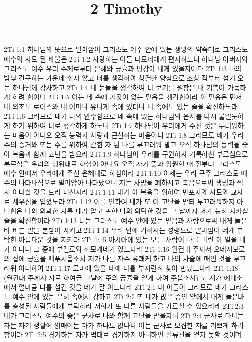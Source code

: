 

\title{2 Timothy}

2Ti 1:1  하나님의 뜻으로 말미암아 그리스도 예수 안에 있는 생명의 약속대로 그리스도 예수의 사도 된 바울은
2Ti 1:2  사랑하는 아들 디모데에게 편지하노니 하나님 아버지와 그리스도 예수 우리 주께로부터 은혜와 긍휼과 평강이 네게 있을지어다
2Ti 1:3  나의 밤낮 간구하는 가운데 쉬지 않고 너를 생각하여 청결한 양심으로 조상 적부터 섬겨 오는 하나님께 감사하고
2Ti 1:4  네 눈물을 생각하여 너 보기를 원함은 내 기쁨이 가득하게 하려 함이니
2Ti 1:5  이는 네 속에 거짓이 없는 믿음을 생각함이라 이 믿음은 먼저 네 외조모 로이스와 네 어머니 유니게 속에 있더니 네 속에도 있는 줄을 확신하노라
2Ti 1:6  그러므로 내가 나의 안수함으로 네 속에 있는 하나님의 은사를 다시 붙일듯하게 하기 위하여 너로 생각하게 하노니
2Ti 1:7  하나님이 우리에게 주신 것은 두려워하는 마음이 아니요 오직 능력과 사랑과 근신하는 마음이니
2Ti 1:8  그러므로 네가 우리 주의 증거와 또는 주를 위하여 갇힌 자 된 나를 부끄러워 말고 오직 하나님의 능력을 좇아 복음과 함께 고난을 받으라
2Ti 1:9  하나님이 우리를 구원하사 거룩하신 부르심으로 부르심은 우리의 행위대로 하심이 아니요 오직 자기 뜻과 영원한 때 전부터 그리스도 예수 안에서 우리에게 주신 은혜대로 하심이라
2Ti 1:10  이제는 우리 구주 그리스도 예수의 나타나심으로 말미암아 나타났으니 저는 사망을 폐하시고 복음으로써 생명과 썩지 아니할 것을 드러 내신지라
2Ti 1:11  내가 이 복음을 위하여 반포자와 사도와 교사로 세우심을 입었노라
2Ti 1:12  이를 인하여 내가 또 이 고난을 받되 부끄러워하지 아니함은 나의 의뢰한 자를 내가 알고 또한 나의 의탁한 것을 그 날까지 저가 능히 지키실 줄을 확신함이라
2Ti 1:13  너는 그리스도 예수 안에 있는 믿음과 사랑으로써 내게 들은바 바른 말을 본받아 지키고
2Ti 1:14  우리 안에 거하시는 성령으로 말미암아 네게 부탁한 아름다운 것을 지키라
2Ti 1:15  아시아에 있는 모든 사람이 나를 버린 이 일을 네가 아나니 그 중에 부겔로와 허모게네가 있느니라
2Ti 1:16  원컨대 주께서 오네시보로의 집에 긍휼을 베푸시옵소서 저가 나를 자주 유쾌케 하고 나의 사슬에 매인 것을 부끄러워 아니하여
2Ti 1:17  로마에 있을 때에 나를 부지런히 찾아 만났느니라
2Ti 1:18  (원컨대 주께서 저로 하여금 그날에 주의 긍휼을 얻게 하여 주옵소서) 또 저가 에베소에서 얼마큼 나를 섬긴 것을 네가 잘 아느니라
2Ti 2:1  내 아들아 그러므로 네가 그리스도 예수 안에 있는 은혜 속에서 강하고
2Ti 2:2  또 네가 많은 증인 앞에서 내게 들은바를 충성된 사람들에게 부탁하라 저희가 또 다른 사람들을 가르칠 수 있으리라
2Ti 2:3  네가 그리스도 예수의 좋은 군사로 나와 함께 고난을 받을지니
2Ti 2:4  군사로 다니는 자는 자기 생활에 얽매이는 자가 하나도 없나니 이는 군사로 모집한 자를 기쁘게 하려 함이라
2Ti 2:5  경기하는 자가 법대로 경기하지 아니하면 면류관을 얻지 못할 것이며
